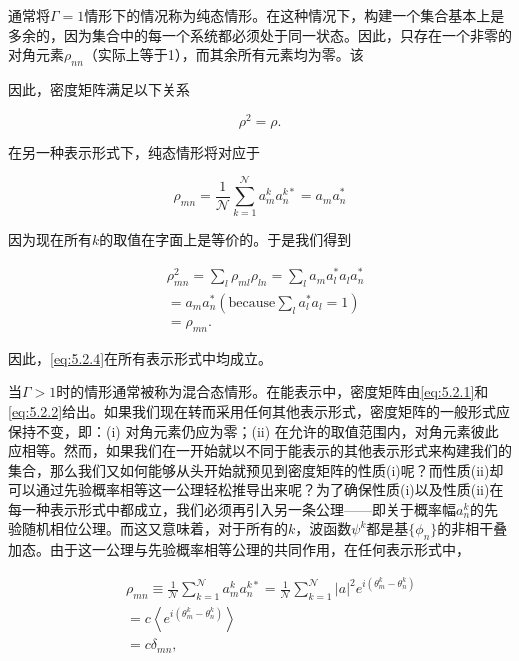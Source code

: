 通常将\(\Gamma=1\)情形下的情况称为纯态情形。在这种情况下，构建一个集合基本上是多余的，因为集合中的每一个系统都必须处于同一状态。因此，只存在一个非零的对角元素\(\rho_{nn}\)（实际上等于1），而其余所有元素均为零。该

因此，密度矩阵满足以下关系

\begin{equation}\tag{5.2.4}\label{eq:5.2.4}
\rho ^{2} = \rho .
\end{equation}

在另一种表示形式下，纯态情形将对应于

\begin{equation}\tag{5.2.5}\label{eq:5.2.5}
\rho _ { m n } = \frac { 1 } { \mathcal { N } } \sum _ { k = 1 } ^{\mathcal { N} } a _ { m } ^{k} a _ { n } ^{k *} = a _ { m } a _ { n } ^{*}
\end{equation}

因为现在所有\(k\)的取值在字面上是等价的。于是我们得到

\begin{equation}\tag{5.2.6}\label{eq:5.2.6}
\begin{array}{rl} & { \rho _ { m n } ^{2} = \sum _ { l } \rho _ { m l } \rho _ { l n } = \sum _ { l } a _ { m } a _ { l } ^{*} a _ { l } a _ { n } ^{*} } \\& {  = a _ { m } a _ { n } ^{*}  \left( \mathrm { b e c a u s e } \sum _ { l } a _ { l } ^{*} a _ { l } = 1 \right) } \\& {  = \rho _ { m n } . } \end{array}
\end{equation}

因此，\autoref{eq:5.2.4}在所有表示形式中均成立。

当\(\Gamma > 1\)时的情形通常被称为混合态情形。在能表示中，密度矩阵由\autoref{eq:5.2.1}和\autoref{eq:5.2.2}给出。如果我们现在转而采用任何其他表示形式，密度矩阵的一般形式应保持不变，即：(i) 对角元素仍应为零；(ii) 在允许的取值范围内，对角元素彼此应相等。然而，如果我们在一开始就以不同于能表示的其他表示形式来构建我们的集合，那么我们又如何能够从头开始就预见到密度矩阵的性质(i)呢？而性质(ii)却可以通过先验概率相等这一公理轻松推导出来呢？为了确保性质(i)以及性质(ii)在每一种表示形式中都成立，我们必须再引入另一条公理------即关于概率幅\(a_{n}^{k}\)的先验随机相位公理。而这又意味着，对于所有的\(k\)，波函数\(\psi^{k}\)都是基\(\{\phi_{n}\}\)的非相干叠加态。由于这一公理与先验概率相等公理的共同作用，在任何表示形式中，

\begin{equation}\tag{5.2.7}\label{eq:5.2.7}
\begin{array}{rlr} & { } & { \rho _ { m n } \equiv \frac { 1 } { \mathcal { N } } \sum _ { k = 1 } ^{\mathcal { N} } a _ { m } ^{k} a _ { n } ^{k *} = \frac { 1 } { \mathcal { N } } \sum _ { k = 1 } ^{\mathcal { N} } | a | ^{2} e ^{i \left( \theta _ { m} ^{k} - \theta _ { n } ^{k} \right) } } \\& { } & { = c \left\langle e ^{i \left( \theta _ { m} ^{k} - \theta _ { n } ^{k} \right) } \right\rangle } \\& { } & { = c \delta _ { m n } , } \end{array}
\end{equation}

